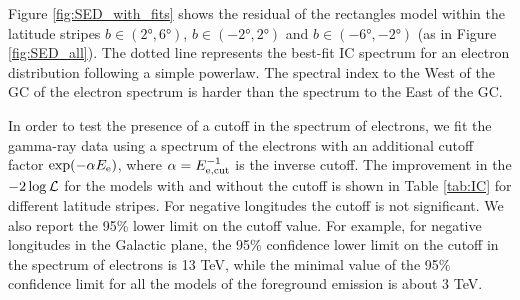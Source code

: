 Figure \ref{fig:SED_with_fits} shows the residual of the rectangles model within the latitude stripes $b \in (\ang{2}, \ang{6})$, $b \in (-\ang{2}, \ang{2})$ and $b \in (-\ang{6}, -\ang{2})$ (as in Figure \ref{fig:SED_all}). The dotted line represents the best-fit IC spectrum for an electron distribution following a simple powerlaw.
The spectral index to the West of the GC of the electron spectrum is harder than the spectrum to the East of the GC. 

In order to test the presence of a cutoff in the spectrum of electrons, we fit the gamma-ray data using a spectrum of the electrons
with an additional cutoff factor $\exp(-\alpha E_{\text{e}})$, where $\alpha = E^{-1}_{\text{e},\text{cut}}$ is the inverse cutoff.
The improvement in the $-2 \log {\mathcal{L}}$ 
for the models with and without the cutoff is shown in Table \ref{tab:IC}
for different latitude stripes.
For negative longitudes the cutoff is not significant.
We also report the 95\% lower limit on the cutoff value. For example, for negative longitudes in the Galactic plane,
the 95\% confidence lower limit on the cutoff in the spectrum of electrons is 13 TeV,
while the minimal value of the 95\% confidence limit for all the models of the foreground emission is about 3 TeV.




